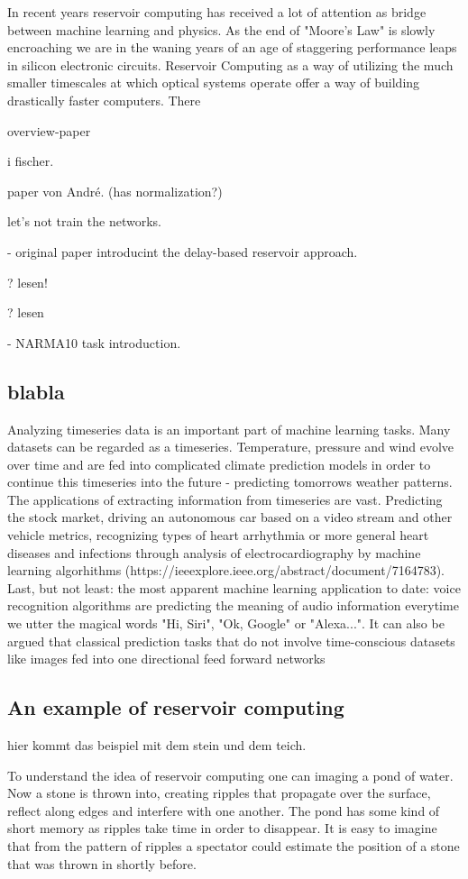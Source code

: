 	In recent years reservoir computing has received a lot of attention as bridge between machine learning and physics. As the end of "Moore's Law" is slowly encroaching we are in the waning years of an age of staggering performance leaps in silicon electronic circuits. Reservoir Computing as a way of utilizing the much smaller timescales at which optical systems operate offer a way of building drastically faster computers. There
	
	\cite{SAN17a} overview-paper

	\cite{LAR12} i fischer.
	
	\cite{ROE18a} paper von André. (has normalization?)
	
	\cite{JAE01} let's not train the networks.
	
	\cite{APP11} - original paper introducint the delay-based reservoir approach.
	
	\cite{ANT19} ? lesen!
	
	\cite{STE20} ? lesen
	
	\cite{ATI00} - NARMA10 task introduction.
	

\subsection{blabla}

Analyzing timeseries data is an important part of machine learning tasks. Many datasets can be regarded as a timeseries. Temperature, pressure and wind evolve over time and are fed into complicated climate prediction models in order to continue this timeseries into the future - predicting tomorrows weather patterns. The applications of extracting information from timeseries are vast. Predicting the stock market, driving an autonomous car based on a video stream and other vehicle metrics, recognizing types of heart arrhythmia or more general heart diseases and infections through analysis of electrocardiography by machine learning algorhithms (https://ieeexplore.ieee.org/abstract/document/7164783). Last, but not least: the most apparent machine learning application to date: voice recognition algorithms are predicting the meaning of audio information everytime we utter the magical words "Hi, Siri", "Ok, Google" or "Alexa...". 
It can also be argued that classical prediction tasks that do not involve time-conscious datasets like images fed into one directional feed forward networks 


\subsection{An example of reservoir computing}

hier kommt das beispiel mit dem stein und dem teich.

To understand the idea of reservoir computing one can imaging a pond of water. Now a stone is thrown into, creating ripples that propagate over the surface, reflect along edges and interfere with one another. The pond has some kind of short memory as ripples take time in order to disappear. 
It is easy to imagine that from the pattern of ripples a spectator could estimate the position of a stone that was thrown in shortly before.  